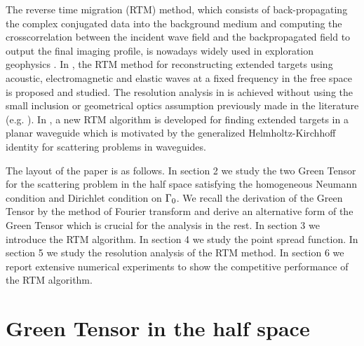 \documentclass[12pt]{iopart}
\begin{document}
The reverse time migration (RTM) method, which consists of back-propagating
the complex conjugated data into the background medium and computing the crosscorrelation between the incident wave field and the backpropagated field to output the
final imaging profile, is nowadays widely used in exploration geophysics \cite{baysal1983reverse,berkhout2012seismic,bleistein2013mathematics,chang1987elastic,claerbout1985imaging}. In \cite{chen2013reverse_acou,chen2013reverse_elec,chen2015reverse_elas},
the RTM method for reconstructing extended targets using acoustic, electromagnetic and elastic
waves at a fixed frequency in the free space is proposed and studied. The resolution
analysis in \cite{chen2013reverse_acou,chen2013reverse_elec,chen2015reverse_elas} is achieved without using the small inclusion or geometrical optics
assumption previously made in the literature (e.g. \cite{ammari2013mathematical,bleistein2013mathematics}). In \cite{chen2015reverse_planar}, a new RTM algorithm
is developed for finding extended targets in a planar waveguide which is motivated by
the generalized Helmholtz-Kirchhoff identity for scattering problems in waveguides.

The layout of the paper is as follows. In section 2 we study the two Green Tensor for
the scattering problem in the half space satisfying the homogeneous Neumann condition and Dirichlet condition on $\Gamma_0$. We recall the derivation of the Green
Tensor by the method of Fourier transform and derive an alternative form of the
Green Tensor which is crucial for the analysis in the rest. In section 3 we introduce the RTM
algorithm. In section 4 we study the point spread function. In section 5 we study
the resolution analysis of the RTM method. In section 6
we report extensive numerical experiments to show the competitive performance of the
RTM algorithm.



\section{Green Tensor in the half space}
\end{document}
